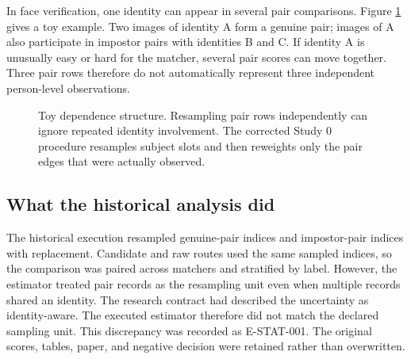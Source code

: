 \documentclass[10pt,a4paper]{article}
\begin{document}
In face verification, one identity can appear in several pair comparisons. Figure
\ref{fig:pair-dependence} gives a toy example. Two images of identity A form a genuine pair;
images of A also participate in impostor pairs with identities B and C. If identity A is
unusually easy or hard for the matcher, several pair scores can move together. Three pair
rows therefore do not automatically represent three independent person-level observations.

\begin{figure}[ht]
\centering
{}
\caption{Toy dependence structure. Resampling pair rows independently can ignore repeated
identity involvement. The corrected Study 0 procedure resamples subject slots and then
reweights only the pair edges that were actually observed.}
\label{fig:pair-dependence}
\end{figure}

\subsection{What the historical analysis did}

The historical execution resampled genuine-pair indices and impostor-pair indices with
replacement. Candidate and raw routes used the same sampled indices, so the comparison was
paired across matchers and stratified by label. However, the estimator treated pair records
as the resampling unit even when multiple records shared an identity. The research contract
had described the uncertainty as identity-aware. The executed estimator therefore did not
match the declared sampling unit. This discrepancy was recorded as E-STAT-001. The original
scores, tables, paper, and negative decision were retained rather than overwritten.
\end{document}
